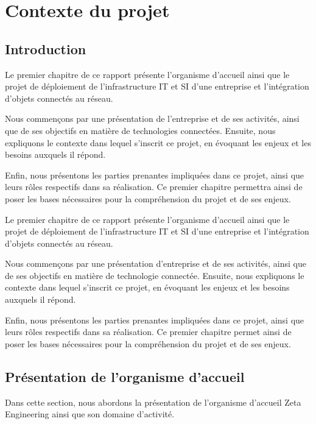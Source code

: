 \chapter{Contexte du projet}


\section{Introduction}
Le premier chapitre de ce rapport présente l'organisme d'accueil ainsi que le projet de déploiement de l'infrastructure IT et SI d'une entreprise et l'intégration d'objets connectés au réseau.

Nous commençons  par une présentation de l'entreprise et de ses activités, ainsi que de ses objectifs en matière de technologies connectées. Ensuite, nous expliquons le contexte dans lequel s'inscrit ce projet, en évoquant les enjeux et les besoins auxquels il répond.

Enfin, nous présentons  les parties prenantes impliquées dans ce projet, ainsi que leurs rôles respectifs dans sa réalisation. Ce premier chapitre permettra ainsi de poser les bases nécessaires pour la compréhension du projet et de ses enjeux.

Le premier chapitre de ce rapport présente l'organisme d'accueil ainsi que le projet de déploiement de l'infrastructure IT et SI d'une entreprise et l'intégration d'objets connectés au réseau. 

Nous commençons par une présentation d'entreprise et de ses activités, ainsi que de ses objectifs en matière de technologie connectée. Ensuite, nous expliquons le contexte dans lequel s'inscrit ce projet, en évoquant les enjeux et les besoins auxquels il répond.
 
Enfin, nous présentons les parties prenantes impliquées dans ce projet, ainsi que leurs rôles respectifs dans sa réalisation. Ce premier chapitre permet ainsi de poser les bases nécessaires pour la compréhension du projet et de ses enjeux. 

\section{Présentation de l'organisme d'accueil }

Dans cette section, nous abordons la présentation de l'organisme d'accueil Zeta Engineering ainsi que son domaine d'activité.

